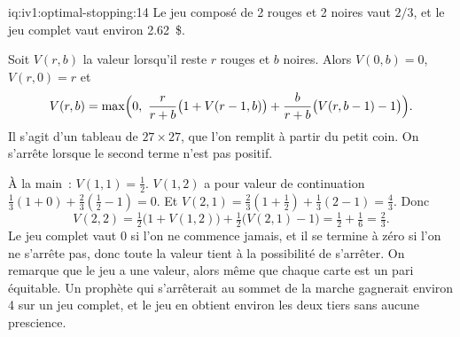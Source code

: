 \begin{solution}{iq:iv1:optimal-stopping:14}
Le jeu composé de 2 rouges et 2 noires vaut $2/3$, et le jeu complet vaut environ 2.62~\$.

Soit $V(r, b)$ la valeur lorsqu'il reste $r$ rouges et $b$ noires. Alors $V(0, b) = 0$, $V(r, 0) = r$ et
\[
V(r, b) = \max\Bigl(0,\ \frac{r}{r + b}\bigl(1 + V(r - 1, b)\bigr) + \frac{b}{r + b}\bigl(V(r, b - 1) - 1\bigr)\Bigr).
\]
Il s'agit d'un tableau de $27 \times 27$, que l'on remplit à partir du petit coin. On s'arrête lorsque le second terme n'est pas positif.

À la main~: $V(1, 1) = \tfrac12$. $V(1, 2)$ a pour valeur de continuation $\tfrac13(1 + 0) + \tfrac23(\tfrac12 - 1) = 0$. Et $V(2, 1) = \tfrac23(1 + \tfrac12) + \tfrac13(2 - 1) = \tfrac43$. Donc
\[
V(2, 2) = \tfrac12\bigl(1 + V(1, 2)\bigr) + \tfrac12\bigl(V(2, 1) - 1\bigr) = \tfrac12 + \tfrac16 = \tfrac23.
\]
Le jeu complet vaut 0 si l'on ne commence jamais, et il se termine à zéro si l'on ne s'arrête pas, donc toute la valeur tient à la possibilité de s'arrêter. On remarque que le jeu a une valeur, alors même que chaque carte est un pari équitable. Un prophète qui s'arrêterait au sommet de la marche gagnerait environ 4 sur un jeu complet, et le jeu en obtient environ les deux tiers sans aucune prescience.

\end{solution}

